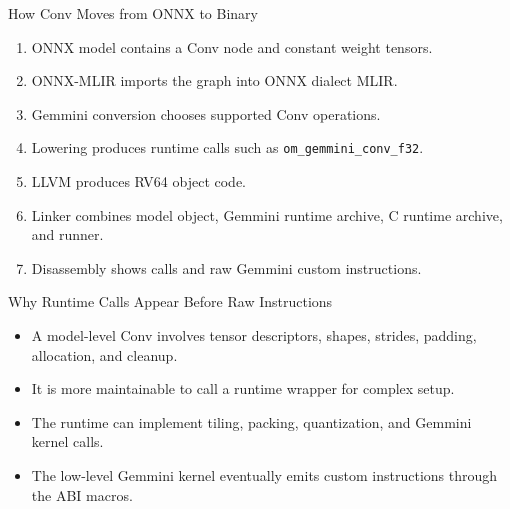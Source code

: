 \documentclass[aspectratio=169,10pt]{beamer}
\newcommand{\code}[1]{\texttt{\footnotesize #1}}
\begin{document}
\begin{frame}{How Conv Moves from ONNX to Binary}
  \begin{enumerate}
    \item ONNX model contains a Conv node and constant weight tensors.
    \item ONNX-MLIR imports the graph into ONNX dialect MLIR.
    \item Gemmini conversion chooses supported Conv operations.
    \item Lowering produces runtime calls such as \code{om\_gemmini\_conv\_f32}.
    \item LLVM produces RV64 object code.
    \item Linker combines model object, Gemmini runtime archive, C runtime archive, and runner.
    \item Disassembly shows calls and raw Gemmini custom instructions.
  \end{enumerate}
\end{frame}

\begin{frame}{Why Runtime Calls Appear Before Raw Instructions}
  \begin{itemize}
    \item A model-level Conv involves tensor descriptors, shapes, strides, padding, allocation, and cleanup.
    \item It is more maintainable to call a runtime wrapper for complex setup.
    \item The runtime can implement tiling, packing, quantization, and Gemmini kernel calls.
    \item The low-level Gemmini kernel eventually emits custom instructions through the ABI macros.
  \end{itemize}
\end{frame}
\end{document}
